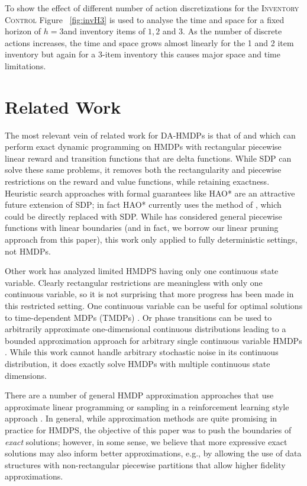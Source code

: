 \documentclass[twoside,11pt]{article}
\newcommand{\InventoryControl}{\textsc{Inventory Control }}
\begin{document}
To show the effect of different number of action discretizations for the \InventoryControl Figure ~\ref{fig:invH3} is used to analyse the time and space for a fixed horizon of $h=3$and inventory items of $1,2$ and 3. As the number of discrete actions increases, the time and space grows almost linearly for the 1 and 2 item inventory but again for a 3-item inventory this causes major space and time limitations. 
\section{Related Work}

The most relevant vein of related work for DA-HMDPs is that of \cite{feng04} and \cite{li05} which can perform exact dynamic programming on
HMDPs with rectangular piecewise linear reward and transition functions
that are delta functions.  While SDP can solve these same problems,
it removes both the rectangularity and piecewise restrictions on the
reward and value functions, while retaining exactness.  
Heuristic search approaches with formal guarantees 
like HAO* \cite{hao09} are an attractive future extension of SDP;
in fact HAO* currently uses the method of \cite{feng04}, which could
be directly replaced with SDP.  While \cite{penberthy94} has considered
general piecewise functions with linear boundaries (and in fact,
we borrow our linear pruning approach from this paper), this work
only applied to fully deterministic settings, not HMDPs.

Other work has analyzed limited HMDPS having only one continuous
state variable.  Clearly rectangular restrictions are meaningless with
only one continuous variable, so it is not surprising that more
progress has been made in this restricted setting.  One continuous
variable can be useful for optimal solutions to time-dependent MDPs 
(TMDPs) \cite{boyan01}.  Or phase transitions can be used to 
arbitrarily approximate one-dimensional continuous distributions
leading to a bounded approximation approach for arbitrary single continuous
variable HMDPs \cite{phase07}.  
While this work cannot handle arbitrary stochastic
noise in its continuous distribution, it does exactly solve HMDPs
with multiple continuous state dimensions.

There are a number of general HMDP approximation
approaches that use approximate linear programming \cite{kveton06}
or sampling in a reinforcement learning style approach \cite{munos02}.
In general, while approximation methods are quite promising in
practice for HMDPS, the objective of this paper was to push
the boundaries of \emph{exact} solutions; however, in some sense, 
we believe that more expressive exact solutions may also inform
better approximations, e.g., by allowing the use of data structures
with non-rectangular piecewise partitions that allow higher fidelity
approximations.
\end{document}

